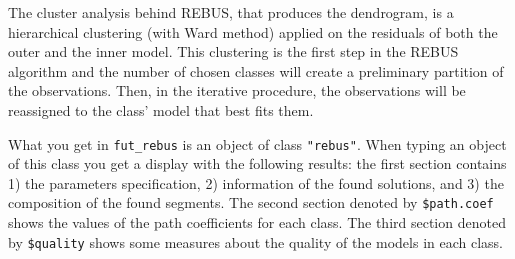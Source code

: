 \documentclass[12pt]{book}\usepackage{graphicx, color}
\newcommand{\code}[1]{\texttt{#1}}
\begin{document}
\vspace{2mm}
The cluster analysis behind REBUS, that produces the dendrogram, is a hierarchical clustering (with Ward method) applied on the residuals of both the outer and the inner model. This clustering is the first step in the REBUS algorithm and the number of chosen classes will create a preliminary partition of the observations. Then, in the iterative procedure, the observations will be reassigned to the class' model that best fits them. 

What you get in \code{fut\_rebus} is an object of class \code{"rebus"}. When typing an object of this class you get a display with the following results: the first section contains 1) the parameters specification, 2) information of the found solutions, and 3) the composition of the found segments. The second section denoted by \code{\$path.coef} shows the values of the path coefficients for each class. The third section denoted by \code{\$quality} shows some measures about the quality of the models in each class.
\end{document}
